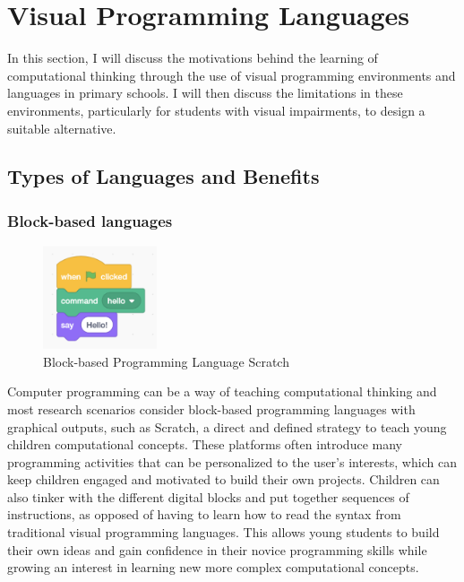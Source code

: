 \documentclass[oneside,%
                    author={Malak Hajji},
                    degree={BSc},
                    title={Designing An Accessible Ozobot Programming Platform for Students},
                  subtitle={With Mixed Visual Abilities}]{dissertation}
\begin{document}
\section{Visual Programming Languages}

In this section, I will discuss the motivations behind the learning of computational thinking through the use of visual programming environments and languages in primary schools.
I will then discuss the limitations in these environments, particularly for students with visual impairments, to design a suitable alternative.

\subsection{Types of Languages and Benefits}
\subsubsection{Block-based languages}
\begin{figure}
    \centering
    \includegraphics[width=0.3\textwidth]{thesis/scratch.eps}
    \caption{Block-based Programming Language Scratch ~\cite{scratch}}
    \label{fig-scratch}
\end{figure}
Computer programming can be a way of teaching computational thinking and most research scenarios consider block-based programming languages with graphical outputs, such as Scratch\cite{scratch}, a direct and defined strategy to teach young children computational concepts\cite{blocks}. These platforms often introduce many programming activities that can be personalized to the user's interests, which can keep children engaged and motivated to build their own projects. Children can also tinker with the different digital blocks and put together sequences of instructions, as opposed of having to learn how to read the syntax from traditional visual programming languages. This allows young students to build their own ideas and gain confidence in their novice programming skills while growing an interest in learning new more complex computational concepts.\cite{confidence}
\end{document}
